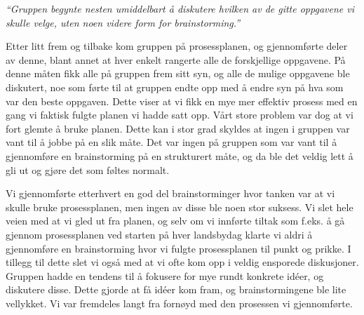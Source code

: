 \emph{“Gruppen begynte nesten umiddelbart å diskutere hvilken av de gitte oppgavene vi skulle velge, uten noen videre form for brainstorming.”} \newline

Etter litt frem og tilbake kom gruppen på prosessplanen, og gjennomførte deler av denne, blant annet at hver enkelt rangerte alle de forskjellige oppgavene. På denne måten fikk alle på gruppen frem sitt syn, og alle de mulige oppgavene ble diskutert, noe som førte til at gruppen endte opp med å endre syn på hva som var den beste oppgaven. Dette viser at vi fikk en mye mer effektiv prosess med en gang vi faktisk fulgte planen vi hadde satt opp. Vårt store problem var dog at vi fort glemte å bruke planen. Dette kan i stor grad skyldes at ingen i gruppen var vant til å jobbe på en slik måte. Det var ingen på gruppen som var vant til å gjennomføre en brainstorming på en strukturert måte, og da ble det veldig lett å gli ut og gjøre det som føltes normalt.

Vi gjennomførte etterhvert en god del brainstorminger hvor tanken var at vi skulle bruke prosessplanen, men ingen av disse ble noen stor suksess. Vi slet hele veien med at vi gled ut fra planen, og selv om vi innførte tiltak som f.eks. å gå gjennom prosessplanen ved starten på hver landsbydag klarte vi aldri å gjennomføre en brainstorming hvor vi fulgte prosessplanen til punkt og prikke. I tillegg til dette slet vi også med at vi ofte kom opp i veldig ensporede diskusjoner. Gruppen hadde en tendens til å fokusere for mye rundt konkrete idéer, og diskutere disse. Dette gjorde at få idéer kom fram, og brainstormingene ble lite vellykket. Vi var fremdeles langt fra fornøyd med den prosessen vi gjennomførte.

